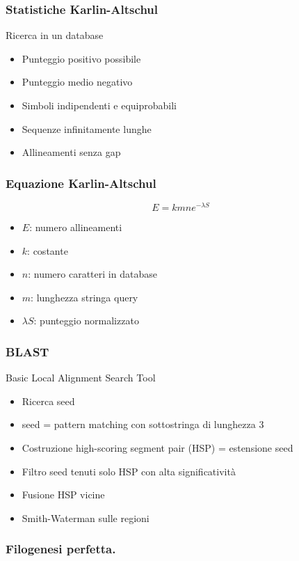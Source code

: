 \begin{frame}[fragile]
\frametitle{Statistiche Karlin-Altschul}
\begin{block}{Ricerca in un database}
\begin{itemize}
\item
Punteggio positivo possibile
\item
Punteggio medio negativo
\item
Simboli indipendenti e equiprobabili
\item
Sequenze infinitamente lunghe
\item
Allineamenti senza gap
\end{itemize}
\end{block}
\end{frame}

\begin{frame}[fragile]
\frametitle{Equazione Karlin-Altschul}
\begin{equation*}
E=kmne^{-\lambda S}
\end{equation*}
\begin{itemize}
\item
$E$: numero allineamenti
\item
$k$: costante
\item
$n$: numero caratteri in database
\item
$m$: lunghezza stringa query
\item
$\lambda S$: punteggio normalizzato
\end{itemize}
\end{frame}

\begin{frame}[fragile]
\frametitle{BLAST}
\begin{block}{Basic Local Alignment Search Tool}
\begin{itemize}
\item
Ricerca seed
\item
seed = pattern matching con sottostringa di lunghezza $3$
\item
Costruzione  high-scoring segment pair (HSP)
= estensione seed
\item
Filtro seed tenuti solo HSP con  alta significatività
\item
Fusione HSP  vicine
\item
Smith-Waterman sulle regioni
\end{itemize}
\end{block}
\end{frame}


\begin{frame}[fragile]
\frametitle{Filogenesi perfetta.}
\end{frame}

